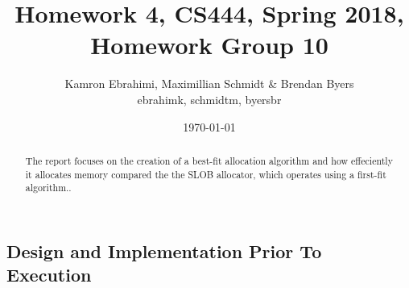 \documentclass[10pt,onecolumn,draftclsnofoot]{IEEEtran} %
\title{ Homework 4, CS444, Spring 2018, Homework Group 10}
\author{Kamron Ebrahimi, Maximillian Schmidt \& Brendan Byers \\ ebrahimk, schmidtm, byersbr }
\date{\today}
\begin{document}
\begin{titlingpage}
\maketitle
\begin{abstract}
\begin{singlespace}
The report focuses on the creation of a best-fit allocation algorithm and how effeciently it allocates memory compared the the SLOB allocator, which operates using a first-fit algorithm.. 
\end{singlespace}
\end{abstract}
\end{titlingpage}


\tableofcontents

\newpage
\begin{singlespace}
\section{\bf  Design and Implementation Prior To Execution}


\end{singlespace}
\end{document}
